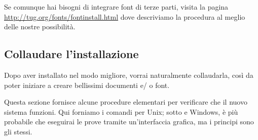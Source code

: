 \documentclass{article}
\begin{document}
Se comunque hai bisogni di integrare font di terze parti, visita la pagina
\url{http://tug.org/fonts/fontinstall.html} dove descriviamo la procedura
al meglio delle nostre possibilità.

\subsection{Collaudare l'installazione}
\label{sec:test-install}

Dopo aver installato \TL{} nel modo migliore, vorrai naturalmente
collaudarla, così da poter iniziare a creare bellissimi documenti e\slash
o font.

Questa sezione fornisce alcune procedure elementari per verificare che il
nuovo sistema funzioni. Qui forniamo i comandi per Unix; sotto \MacOSX e
Windows, è più probabile che eseguirai le prove tramite un'interfaccia
grafica, ma i principi sono gli stessi.
\end{document}
